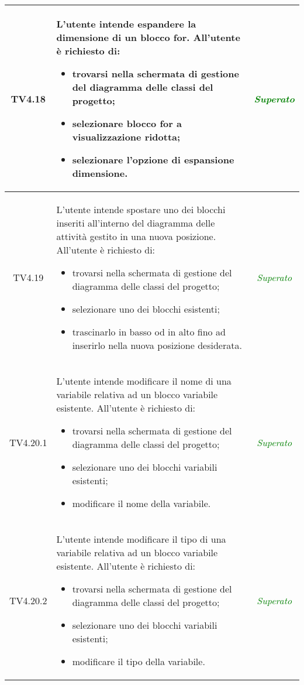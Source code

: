 \begin{longtable}{|c|>{}m{8cm}|c|}
\hypertarget{TV4.18}{TV4.18} & L'utente intende espandere la dimensione di un blocco for.
All'utente è richiesto di:
\begin{itemize}
	\item trovarsi nella schermata di gestione del diagramma delle classi del progetto;
	\item selezionare blocco for a visualizzazione ridotta;
	\item selezionare l'opzione di espansione dimensione.
\end{itemize} & \textcolor{Green}{\textit{Superato}}\\ \hline

\hypertarget{TV4.19}{TV4.19} & L'utente intende spostare uno dei blocchi inseriti all’interno del diagramma delle attività gestito in una nuova posizione.
All'utente è richiesto di:
\begin{itemize}
	\item trovarsi nella schermata di gestione del diagramma delle classi del progetto;
	\item selezionare uno dei blocchi esistenti;
	\item trascinarlo in basso od in alto fino ad inserirlo nella nuova posizione desiderata.
\end{itemize} & \textcolor{Green}{\textit{Superato}}\\ \hline

\hypertarget{TV4.20.1}{TV4.20.1} & L'utente intende modificare il nome di una variabile relativa ad un blocco variabile esistente.
All'utente è richiesto di:
\begin{itemize}
	\item trovarsi nella schermata di gestione del diagramma delle classi del progetto;
	\item selezionare uno dei blocchi variabili esistenti;
	\item modificare il nome della variabile.
\end{itemize} & \textcolor{Green}{\textit{Superato}}\\ \hline

\hypertarget{TV4.20.2}{TV4.20.2} & L'utente intende modificare il tipo di una variabile relativa ad un blocco variabile esistente.
All'utente è richiesto di:
\begin{itemize}
	\item trovarsi nella schermata di gestione del diagramma delle classi del progetto;
	\item selezionare uno dei blocchi variabili esistenti;
	\item modificare il tipo della variabile.
\end{itemize} & \textcolor{Green}{\textit{Superato}}\\ \hline


\end{longtable}
